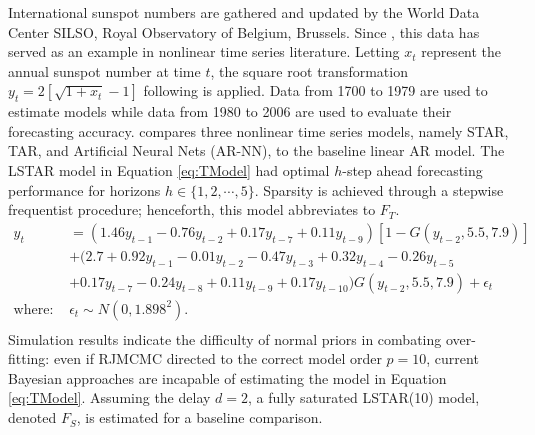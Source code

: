 International sunspot numbers are gathered and updated by the World Data Center SILSO, Royal Observatory of Belgium, Brussels. Since \cite{Granger1957} , this data has served as an example in nonlinear time series literature. Letting $x_t$ represent the annual sunspot number at time $t$, the square root transformation $y_t= 2[\sqrt{1+x_t}-1]$ following \cite{Ghaddar1981} is applied. Data from 1700 to 1979 are used to estimate models while data from 1980 to 2006 are used to evaluate their forecasting accuracy. \cite{Terasvirta2010} compares three nonlinear time series models, namely STAR, TAR, and Artificial Neural Nets (AR-NN), to the baseline linear AR model. The LSTAR model in Equation \ref{eq:TModel} had optimal $h$-step ahead forecasting performance for horizons $h \in \{1,2,\cdots,5\}$. Sparsity is achieved through a stepwise frequentist procedure; henceforth, this model abbreviates to $F_T$. 
\begin{equation}
\begin{split}
 	y_t &=(1.46y_{t-1}-0.76y_{t-2}+0.17y_{t-7}+0.11y_{t-9})[1-G(y_{t-2},5.5,7.9)]\\
 	&+(2.7+0.92y_{t-1}-0.01y_{t-2}-0.47y_{t-3}+0.32y_{t-4}-0.26y_{t-5}\\
 	&+0.17y_{t-7}-0.24y_{t-8}+0.11y_{t-9}+0.17y_{t-10})G(y_{t-2},5.5,7.9)+\hat{\epsilon}_t\\
 	\textrm{where: } & \hat{\epsilon}_t \sim N(0, 1.898^2).\\
\end{split}
\label{eq:TModel}
\end{equation}
Simulation results indicate the difficulty of normal priors in combating over-fitting: even if RJMCMC directed to the correct model order $p=10$, current Bayesian approaches are incapable of estimating the model in Equation \ref{eq:TModel}. Assuming the delay $d=2$, a fully saturated LSTAR(10) model, denoted $F_S$, is estimated for a baseline comparison.

